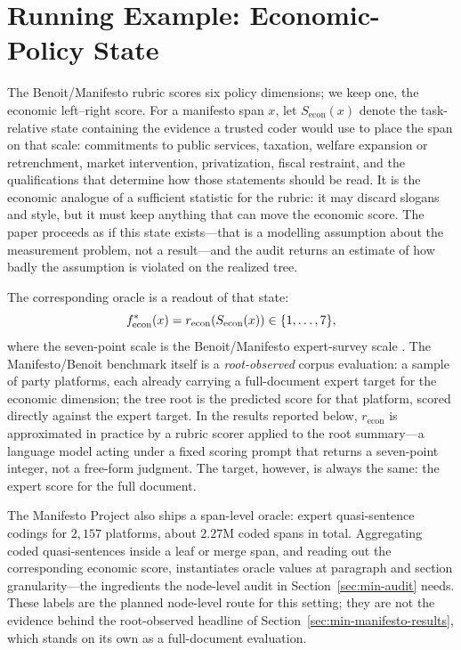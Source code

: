 \section{Running Example: Economic-Policy State}\label{sec:min-manifesto-state}

The Benoit/Manifesto rubric scores six policy dimensions; we keep one, the
economic left--right score. For a manifesto span $x$, let
$S_{\mathrm{econ}}(x)$ denote the task-relative state containing the
evidence a trusted coder would use to place the span on that scale:
commitments to public services, taxation, welfare
expansion or retrenchment, market intervention, privatization, fiscal
restraint, and the qualifications that determine how those statements should
be read. It is the economic analogue of a sufficient statistic for the
rubric: it may discard slogans and style, but it must keep anything that can
move the economic score. The paper proceeds as if this state exists---that
is a modelling assumption about the measurement problem, not a result---and
the audit returns an estimate of how badly the assumption is violated on
the realized tree.

The corresponding oracle is a readout of that state:
\[
  f^\ast_{\mathrm{econ}}(x)
  = r_{\mathrm{econ}}\!\left( S_{\mathrm{econ}}(x) \right)
  \in \{1, \ldots, 7\},
\]
where the seven-point scale is the Benoit/Manifesto expert-survey scale
\citep{BenoitEtAl2025}. The Manifesto/Benoit benchmark itself is a
\emph{root-observed} corpus evaluation: a sample of party platforms, each
already carrying a full-document expert target for the economic dimension;
the tree root is the predicted score for that platform, scored directly
against the expert target. In the results reported below,
$r_{\mathrm{econ}}$ is approximated in practice by a rubric scorer applied
to the root summary---a language model acting under a fixed scoring prompt
that returns a seven-point integer, not a free-form judgment. The target,
however, is always the same: the expert score for the full document.

The Manifesto Project also ships a span-level oracle: expert
quasi-sentence codings for $2{,}157$ platforms, about $2.27$M coded spans
in total. Aggregating coded quasi-sentences inside a leaf or merge span,
and reading out the corresponding economic score, instantiates oracle
values at paragraph and section granularity---the ingredients the
node-level audit in Section~\ref{sec:min-audit} needs. These labels
are the planned node-level route for this setting; they are not the
evidence behind the root-observed headline of
Section~\ref{sec:min-manifesto-results}, which stands on its own as a
full-document evaluation.

